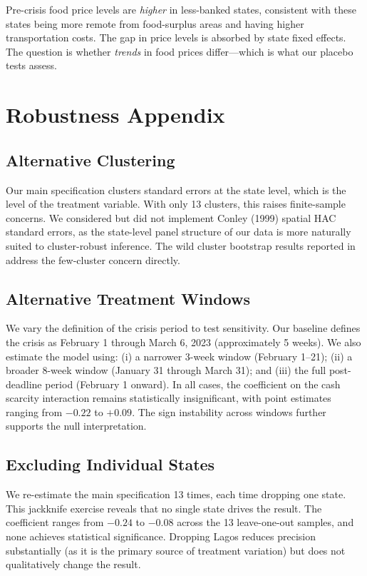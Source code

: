 \documentclass[12pt]{article}
\begin{document}
Pre-crisis food price levels are \textit{higher} in less-banked states, consistent with these states being more remote from food-surplus areas and having higher transportation costs. The gap in price levels is absorbed by state fixed effects. The question is whether \textit{trends} in food prices differ---which is what our placebo tests assess.


\section{Robustness Appendix}
\label{app:robustness}

\subsection{Alternative Clustering}

Our main specification clusters standard errors at the state level, which is the level of the treatment variable. With only 13 clusters, this raises finite-sample concerns. We considered but did not implement Conley (1999) spatial HAC standard errors, as the state-level panel structure of our data is more naturally suited to cluster-robust inference. The wild cluster bootstrap results reported in  address the few-cluster concern directly.

\subsection{Alternative Treatment Windows}

We vary the definition of the crisis period to test sensitivity. Our baseline defines the crisis as February 1 through March 6, 2023 (approximately 5 weeks). We also estimate the model using: (i) a narrower 3-week window (February 1--21); (ii) a broader 8-week window (January 31 through March 31); and (iii) the full post-deadline period (February 1 onward). In all cases, the coefficient on the cash scarcity interaction remains statistically insignificant, with point estimates ranging from $-0.22$ to $+0.09$. The sign instability across windows further supports the null interpretation.

\subsection{Excluding Individual States}

We re-estimate the main specification 13 times, each time dropping one state. This jackknife exercise reveals that no single state drives the result. The coefficient ranges from $-0.24$ to $-0.08$ across the 13 leave-one-out samples, and none achieves statistical significance. Dropping Lagos reduces precision substantially (as it is the primary source of treatment variation) but does not qualitatively change the result.
\end{document}
